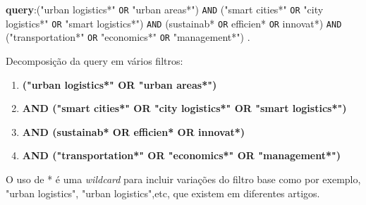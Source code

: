\documentclass[
MEECAS,			%
portuguese,		%
]{DEEclass}
\author{Eduardo Miguel Moreira Junqueira}
\begin{document}






\renewcommand{\checktoopen}{%
  \clearpage
  \ifdef{\phantomsection}{\phantomsection}{}
}





%




\beginannexes

\label{anexo:base_dados_resultados_query}
\textbf{\gls{query}}:("urban logistics*" \verb|OR| "urban areas*") \verb|AND| ("smart cities*" \verb|OR| "city logistics*" \verb|OR| "smart logistics*") \verb|AND| (sustainab* \verb|OR| efficien* \verb|OR| innovat*) \verb|AND| ("transportation*" \verb|OR| "economics*" \verb|OR| "management*") \cite{JunqueiraDevEduardoRepositório}.

Decomposição da \gls{query} em vários filtros:

\begin{enumerate}
    \item\textbf{("urban logistics*" OR "urban areas*")}
    \item \textbf{AND ("smart cities*" OR "city logistics*" OR "smart logistics*")}
    \item \textbf{AND (sustainab* OR efficien* OR innovat*)}
    \item \textbf{AND ("transportation*" OR "economics*" OR "management*")}
\end{enumerate}
O uso de * é uma \textit{wildcard} para incluir variações do filtro base como por exemplo,  "urban logistics", "urban logistics",etc, que existem em diferentes artigos.
\label{anexo:figuras_complementares_wos}
\end{document}
